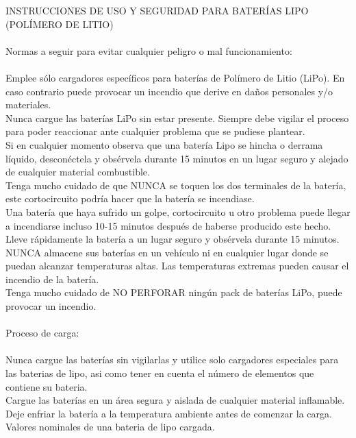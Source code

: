 \documentclass[a4paper]{book}
\begin{document}
INSTRUCCIONES DE USO Y SEGURIDAD PARA BATERÍAS LIPO (POLÍMERO DE LITIO)\\
\\
Normas a seguir para evitar cualquier peligro o mal funcionamiento:\\
\\
    Emplee sólo cargadores específicos para baterías de Polímero de Litio (LiPo). En caso contrario puede provocar un 
    incendio que derive en daños personales y/o materiales.\\
    Nunca cargue las baterías LiPo sin estar presente. Siempre debe vigilar el proceso para poder reaccionar ante cualquier
    problema que se pudiese plantear.\\
    Si en cualquier momento observa que una batería Lipo se hincha o derrama líquido, desconéctela y obsérvela durante 15
    minutos en un lugar seguro y alejado de cualquier material combustible.\\
    Tenga mucho cuidado de que NUNCA se toquen los dos terminales de la batería, este cortocircuito podría hacer que la 
    batería se incendiase.\\
    Una batería que haya sufrido un golpe, cortocircuito u otro problema puede llegar a incendiarse incluso 10-15 minutos 
    después de haberse producido este hecho. Lleve rápidamente la batería a un lugar seguro y obsérvela durante 15 minutos.\\
    NUNCA almacene sus baterías en un vehículo ni en cualquier lugar donde se puedan alcanzar temperaturas altas. Las 
    temperaturas extremas pueden causar el incendio de la batería.\\
    Tenga mucho cuidado de NO PERFORAR ningún pack de baterías LiPo, puede provocar un incendio.\\
    \\
Proceso de carga:\\
\\
    Nunca cargue las baterías sin vigilarlas y utilice solo cargadores especiales para las baterias de lipo, asi como tener
    en cuenta el número de elementos que contiene su bateria.\\
    Cargue las baterías en un área segura y aislada de cualquier material inflamable.\\
    Deje enfriar la batería a la temperatura ambiente antes de comenzar la carga.\\
    Valores nominales de una bateria de lipo cargada.\\
\\
\end{document}
